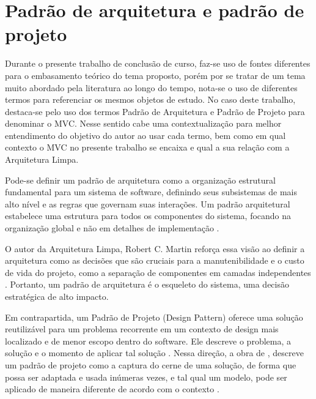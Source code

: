 \section{Padrão de arquitetura e padrão de projeto}

    \par Durante o presente trabalho de conclusão de curso, faz-se uso de fontes diferentes para o embasamento teórico do tema proposto, porém por se tratar de um tema muito abordado pela literatura ao longo do tempo, nota-se o uso de diferentes termos para referenciar os mesmos objetos de estudo. No caso deste trabalho, destaca-se pelo uso dos termos Padrão de Arquitetura e Padrão de Projeto para denominar o MVC. Nesse sentido cabe uma contextualização para melhor entendimento do objetivo do autor ao usar cada termo, bem como em qual contexto o MVC no presente trabalho se encaixa e qual a sua relação com a Arquitetura Limpa.
    
    \par Pode-se definir um padrão de arquitetura como a organização estrutural fundamental para um sistema de software, definindo seus subsistemas de mais alto nível e as regras que governam suas interações. Um padrão arquitetural estabelece uma estrutura para todos os componentes do sistema, focando na organização global e não em detalhes de implementação \cite{livro:pressman:engenharia:2021}. 
    
    \par O autor da Arquitetura Limpa, Robert C. Martin reforça essa visão ao definir a arquitetura como as decisões que são cruciais para a manutenibilidade e o custo de vida do projeto, como a separação de componentes em camadas independentes \cite{livro:martin:cleanarch}. Portanto, um padrão de arquitetura é o esqueleto do sistema, uma decisão estratégica de alto impacto.

    \par Em contrapartida, um Padrão de Projeto (Design Pattern) oferece uma solução reutilizável para um problema recorrente em um contexto de design mais localizado e de menor escopo dentro do software. Ele descreve o problema, a solução e o momento de aplicar tal solução \cite{livro:pressman:engenharia:2021}. Nessa direção, a obra de \cite{livro:gamma:padroes}, descreve um padrão de projeto como a captura do cerne de uma solução, de forma que possa ser adaptada e usada inúmeras vezes, e tal qual um modelo, pode ser aplicado de maneira diferente de acordo com o contexto \cite{livro:gamma:padroes}.

